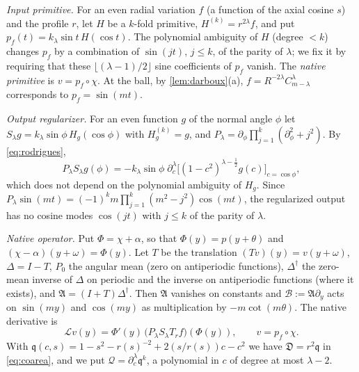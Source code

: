 \documentclass[11pt]{amsart}
\numberwithin{equation}{section}
\theoremstyle{definition}
\theoremstyle{remark}
\newcommand{\Disc}{\mathfrak D}
\newcommand{\cA}{\mathfrak A}
\newcommand{\cB}{\mathcal B}
\begin{document}
\emph{Input primitive.} For an even radial variation $f$ (a function of the axial cosine $s$) and the profile $r$, let $H$ be a $k$-fold primitive, $H^{(k)}=r^{2\lambda}f$, and put $p_f(t)=k_\lambda\sin t\,H(\cos t)$. The polynomial ambiguity of $H$ (degree $<k$) changes $p_f$ by a combination of $\sin(jt)$, $j\le k$, of the parity of $\lambda$; we fix it by requiring that these $\lfloor(\lambda-1)/2\rfloor$ sine coefficients of $p_f$ vanish. The \emph{native primitive} is $v=p_f\circ\chi$. At the ball, by \cref{lem:darboux}(a), $f=R^{-2\lambda}C^\lambda_{m-\lambda}$ corresponds to $p_f=\sin(mt)$.

\emph{Output regularizer.} For an even function $g$ of the normal angle $\phi$ let $S_\lambda g=k_\lambda\sin\phi\,H_g(\cos\phi)$ with $H_g^{(k)}=g$, and $P_\lambda=\partial_\phi\prod_{j=1}^k(\partial_\phi^2+j^2)$. By \eqref{eq:rodrigues},
\begin{equation}\label{eq:PS}
P_\lambda S_\lambda g(\phi)=-k_\lambda\sin\phi\;\partial_c^{\lambda}\bigl[(1-c^2)^{\lambda-\frac12}g(c)\bigr]_{c=\cos\phi},
\end{equation}
which does not depend on the polynomial ambiguity of $H_g$. Since $P_\lambda\sin(mt)=(-1)^km\prod_{j=1}^k(m^2-j^2)\cos(mt)$, the regularized output has no cosine modes $\cos(jt)$ with $j\le k$ of the parity of $\lambda$.

\emph{Native operator.} Put $\Phi=\chi+\alpha$, so that $\Phi(y)=p(y+\theta)$ and $(\chi-\alpha)(y+\omega)=\Phi(y)$. Let $T$ be the translation $(Tv)(y)=v(y+\omega)$, $\Delta=I-T$, $P_0$ the angular mean (zero on antiperiodic functions), $\Delta^\dagger$ the zero-mean inverse of $\Delta$ on periodic and the inverse on antiperiodic functions (where it exists), and $\cA=(I+T)\Delta^\dagger$. Then $\cA$ vanishes on constants and $\cB:=\cA\partial_y$ acts on $\sin(my)$ and $\cos(my)$ as multiplication by $-m\cot(m\theta)$. The native derivative is
\[
\mathcal Lv(y)=\Phi'(y)\,\bigl(P_\lambda S_\lambda T_rf\bigr)(\Phi(y)),\qquad v=p_f\circ\chi .
\]
With $\mathfrak q(c,s)=1-s^2-r(s)^{-2}+2(s/r(s))c-c^2$ we have $\Disc=r^2\mathfrak q$ in \eqref{eq:coarea}, and we put $\mathcal Q=\partial_c^\lambda\mathfrak q^k$, a polynomial in $c$ of degree at most $\lambda-2$.
\end{document}

